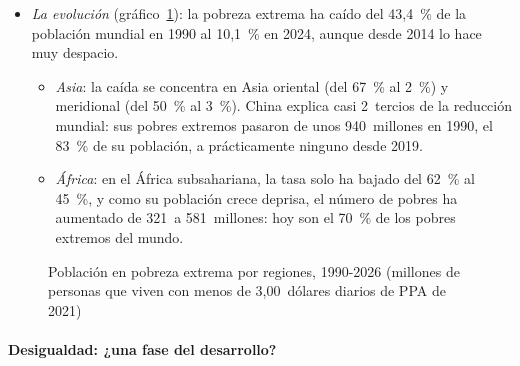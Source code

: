 \documentclass[11pt]{article}
\begin{document}
\begin{itemize}
\item \emph{La evolución} (gráfico~\ref{fig:pobreza-regiones}): la pobreza extrema ha caído del 43,4~\% de la población mundial en 1990 al 10,1~\% en 2024, aunque desde 2014 lo hace muy despacio\nocite{BM2026PIP}.
  \begin{itemize}
  \item \emph{Asia}: la caída se concentra en Asia oriental (del 67~\% al 2~\%) y meridional (del 50~\% al 3~\%). China explica casi 2~tercios de la reducción mundial: sus pobres extremos pasaron de unos 940~millones en 1990, el 83~\% de su población, a prácticamente ninguno desde 2019\nocite{BM2026PIP}.
  \item \emph{África}: en el África subsahariana, la tasa solo ha bajado del 62~\% al 45~\%, y como su población crece deprisa, el número de pobres ha aumentado de 321~a 581~millones: hoy son el 70~\% de los pobres extremos del mundo\nocite{BM2026PIP}.
  \end{itemize}
\end{itemize}

\begin{figure}[H]
\centering
\caption{Población en pobreza extrema por regiones, 1990-2026 (millones de personas que viven con menos de 3,00~dólares diarios de PPA de 2021)}\label{fig:pobreza-regiones}
\end{figure}

\paragraph{Desigualdad: ¿una fase del desarrollo?}
\end{document}
